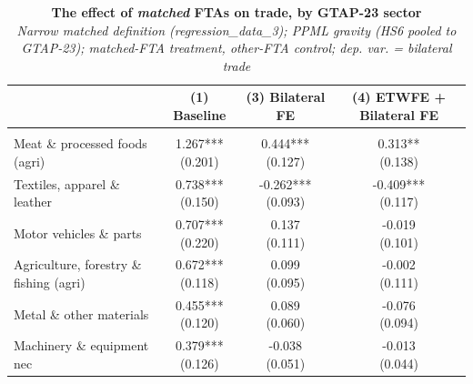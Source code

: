 \begin{table}[t]
\caption*{
{\fontsize{20}{25}\selectfont  \textbf{The effect of \emph{matched} FTAs on trade, by GTAP-23 sector}\fontsize{10}{12}\selectfont } \\ 
{\fontsize{14}{17}\selectfont  \emph{Narrow matched definition (regression\_data\_3); PPML gravity (HS6 pooled to GTAP-23); matched-FTA treatment, other-FTA control; dep. var. = bilateral trade}\fontsize{10}{12}\selectfont }
} 
\fontsize{10.0pt}{12.0pt}\selectfont
\begin{tabular*}{\linewidth}{@{\extracolsep{\fill}}l|ccc}
\toprule
 & {\bfseries (1) Baseline} & {\bfseries (3) Bilateral FE} & {\bfseries (4) ETWFE + Bilateral FE} \\ 
\midrule\addlinespace[2.5pt]
\multicolumn{4}{l}{{\itshape \bfseries A. Matched-FTA effect by GTAP-23 sector}} \\[2.5pt] 
\midrule\addlinespace[2.5pt]
Meat \& processed foods (agri) & \shortstack[l]{1.267*** \\(0.201)} & \shortstack[l]{0.444*** \\(0.127)} & \shortstack[l]{0.313** \\(0.138)} \\ 
Textiles, apparel \& leather & \shortstack[l]{0.738*** \\(0.150)} & \shortstack[l]{-0.262*** \\(0.093)} & \shortstack[l]{-0.409*** \\(0.117)} \\ 
Motor vehicles \& parts & \shortstack[l]{0.707*** \\(0.220)} & \shortstack[l]{0.137 \\(0.111)} & \shortstack[l]{-0.019 \\(0.101)} \\ 
Agriculture, forestry \& fishing (agri) & \shortstack[l]{0.672*** \\(0.118)} & \shortstack[l]{0.099 \\(0.095)} & \shortstack[l]{-0.002 \\(0.111)} \\ 
Metal \& other materials & \shortstack[l]{0.455*** \\(0.120)} & \shortstack[l]{0.089 \\(0.060)} & \shortstack[l]{-0.076 \\(0.094)} \\ 
Machinery \& equipment nec & \shortstack[l]{0.379*** \\(0.126)} & \shortstack[l]{-0.038 \\(0.051)} & \shortstack[l]{-0.013 \\(0.044)} \\ 

\end{tabular*}
\end{table}
